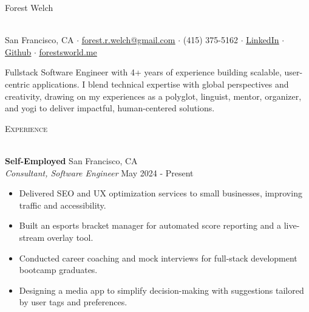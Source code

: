 \documentclass[a4paper]{article}
\newcommand{\header}[1]{
    {\hspace*{-18pt}\vspace*{3pt} \textcolor{deeppurple}{\textsc{#1}}}
    \vspace*{-12pt} \\
    \hspace*{-18pt} \textcolor{deeppurple}{\hrulefill} \\
}
\begin{document}
\vspace{-40pt}

\begin{center}
    \begin{minipage}{\textwidth}
        \centering
        {\fontsize{36}{36}\selectfont \textcolor{deeppurple}{Forest Welch}}
        \hspace{0.3cm}
    \end{minipage}
    \\ 
    \vspace{10pt}
    \small San Francisco, CA $\cdot$ \href{mailto:forest.r.welch@gmail.com}{\underline{forest.r.welch@gmail.com}} $\cdot$ (415) 375-5162 $\cdot$ \href{https://linkedin.com/in/forestrwelch}{\underline{LinkedIn}} $\cdot$ \href{https://github.com/nwelchr}{\underline{Github}} $\cdot$ \href{https://forestsworld.me/}{\underline{forestsworld.me}}
\end{center}

\begin{center}
   Fullstack Software Engineer with 4+ years of experience building scalable, user-centric applications. I blend technical expertise with global perspectives and creativity, drawing on my experiences as a polyglot, linguist, mentor, organizer, and yogi to deliver impactful, human-centered solutions.
\end{center}

\header{Experience}
\vspace{1mm}

\textbf{Self-Employed} \hfill San Francisco, CA\\
\textit{Consultant, Software Engineer} \hfill May 2024 - Present\\
\vspace{-1mm}
\begin{itemize} \itemsep .5pt
    \item Delivered SEO and UX optimization services to small businesses, improving traffic and accessibility.
    \item Built an esports bracket manager for automated score reporting and a live-stream overlay tool.
    \item Conducted career coaching and mock interviews for full-stack development bootcamp graduates.
    \item Designing a media app to simplify decision-making with suggestions tailored by user tags and preferences.
\end{itemize}
\end{document}

